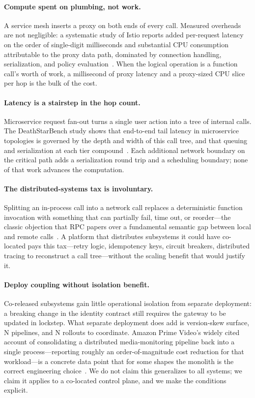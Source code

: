 \documentclass[11pt]{article}
\begin{document}
\paragraph{Compute spent on plumbing, not work.}
A service mesh inserts a proxy on both ends of every call. Measured
overheads are not negligible: a systematic study of Istio reports added
per-request latency on the order of single-digit milliseconds and
substantial CPU consumption attributable to the proxy data path, dominated
by connection handling, serialization, and policy
evaluation~\cite{istio_overhead}. When the logical operation is a function
call's worth of work, a millisecond of proxy latency and a proxy-sized CPU
slice per hop is the bulk of the cost.

\paragraph{Latency is a stairstep in the hop count.}
Microservice request fan-out turns a single user action into a tree of
internal calls. The DeathStarBench study shows that end-to-end tail latency
in microservice topologies is governed by the depth and width of this
call tree, and that queuing and serialization at each tier
compound~\cite{deathstarbench}. Each additional network boundary on the
critical path adds a serialization round trip and a scheduling boundary;
none of that work advances the computation.

\paragraph{The distributed-systems tax is involuntary.}
Splitting an in-process call into a network call replaces a deterministic
function invocation with something that can partially fail, time out, or
reorder---the classic objection that RPC papers over a fundamental
semantic gap between local and remote calls~\cite{rpc_fallacy}. A platform
that distributes subsystems it could have co-located pays this tax---retry
logic, idempotency keys, circuit breakers, distributed tracing to
reconstruct a call tree---without the scaling benefit that would justify
it.

\paragraph{Deploy coupling without isolation benefit.}
Co-released subsystems gain little operational isolation from separate
deployment: a breaking change in the identity contract still requires the
gateway to be updated in lockstep. What separate deployment does add is
version-skew surface, N pipelines, and N rollouts to coordinate. Amazon
Prime Video's widely cited account of consolidating a distributed
media-monitoring pipeline back into a single process---reporting roughly an
order-of-magnitude cost reduction for that workload---is a concrete data
point that for some shapes the monolith is the
correct engineering choice~\cite{amazon_prime_monolith}. We do not claim
this generalizes to all systems; we claim it applies to a co-located
control plane, and we make the conditions explicit.
\end{document}
